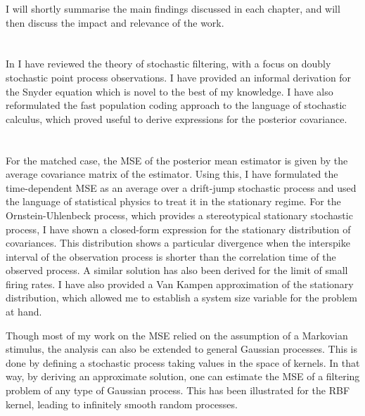 

I will shortly summarise the main findings discussed in each chapter, and will then discuss the impact and relevance of the work.

\section*{}

In  I have reviewed the theory of stochastic filtering, with a focus on doubly stochastic point process observations. I have provided an informal derivation for the Snyder equation which is novel to the best of my knowledge. I have also reformulated the fast population coding approach to the language of stochastic calculus, which proved useful to
derive expressions for the posterior covariance.

\section*{}

For the matched case, the MSE of the posterior mean estimator is given by the average covariance matrix of the estimator. Using this, I have formulated the time-dependent MSE
as an average over a drift-jump stochastic process and used the language of statistical physics to treat it in the stationary regime. For the Ornstein-Uhlenbeck process, which provides
a stereotypical stationary stochastic process, I have shown a closed-form expression for the stationary distribution of covariances. This distribution shows a particular divergence when
the interspike interval of the observation process is shorter than the correlation time of the observed process.  A similar solution has also been derived for the limit of small firing rates. I have
also provided a Van Kampen approximation of the stationary distribution, which allowed me to establish a system size variable for the problem at hand.\par

Though most of my work on the MSE relied on the assumption of a Markovian stimulus, the analysis can also be extended to general Gaussian processes. This is done by defining a
stochastic process taking values in the space of kernels. In that way, by deriving an approximate solution, one can estimate the MSE of a filtering problem of any type of Gaussian process. This has been illustrated for the RBF kernel, leading to infinitely smooth random processes.

